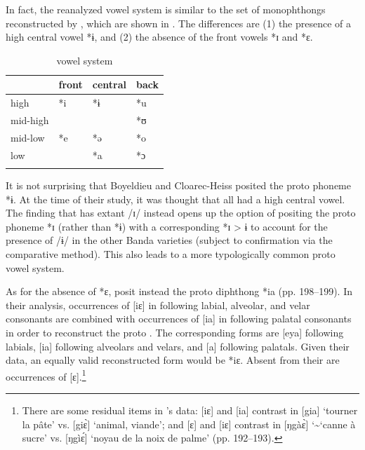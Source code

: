 \documentclass[output=paper,colorlinks,citecolor=brown]{langscibook}
\begin{document}
In fact, the reanalyzed  vowel system  is similar to the set of  monophthongs reconstructed by \citeauthor{BoyeldieuCloarec-Heiss2001}, which are shown in . The differences are (1) the presence of a high central vowel *ɨ, and (2) the absence of the front vowels *ɪ and *ɛ.

\begin{table}
\caption{ vowel system \citep{BoyeldieuCloarec-Heiss2001}}
\label{tab:olson:12}
    \begin{tabular}{llll}
    \lsptoprule
                    & front & central   & back\\
    \midrule
        high        & *i    & *ɨ        & *u\\
        mid-high    &       &           & *ʊ\\
        mid-low     & *e    & *ə        & *o\\
        low         &       & *a        & *ɔ\\
    \lspbottomrule
    \end{tabular}
\end{table}

It is not surprising that Boyeldieu and Cloarec-Heiss posited the proto phoneme *ɨ. At the time of their study, it was thought that all  had a high central vowel. The finding that  has extant /ɪ/ instead opens up the option of positing the proto phoneme *ɪ (rather than *ɨ) with a corresponding  *ɪ > ɨ to account for the presence of /ɨ/ in the other Banda  varieties (subject to confirmation via the comparative method). This also leads to a more typologically  common proto vowel system.

As for the absence of *ɛ, \citeauthor{BoyeldieuCloarec-Heiss2001} posit instead the proto diphthong *ia (pp. 198--199). In their analysis, occurrences of [iɛ] in  following labial, alveolar, and velar consonants are combined with occurrences of [ia] in  following palatal consonants in order to reconstruct the proto . The corresponding  forms are [eya] following labials, [ia] following alveolars and velars, and [a] following palatals. Given their data, an equally valid reconstructed form would be *iɛ. Absent from their  are occurrences of [ɛ].\footnote{There are some residual items in \citeauthor{BoyeldieuCloarec-Heiss2001}'s data: [iɛ] and [ia] contrast in [gia] ‘tourner la pâte’ vs. [giɛ̀] ‘animal, viande’; and [ɛ] and [iɛ] contrast in [ŋgàɛ̀] \char`\~ \space [ŋgɛ̀] ‘canne à sucre’ vs. [ŋgìɛ́] ‘noyau de la noix de palme’ (pp. 192--193).}
\end{document}

